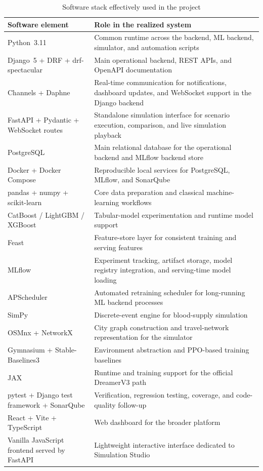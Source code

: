 \begin{table}[htbp]
\centering
\caption{Software stack effectively used in the project}
\label{tab:software-environment}
\small
\begin{tabular}{@{}lp{9.5cm}@{}}
\toprule
\textbf{Software element} & \textbf{Role in the realized system} \\
\midrule
Python~3.11 & Common runtime across the backend, ML backend, simulator, and automation scripts \\
Django~5 + DRF + drf-spectacular & Main operational backend, REST APIs, and OpenAPI documentation \\
Channels + Daphne & Real-time communication for notifications, dashboard updates, and WebSocket support in the Django backend \\
FastAPI + Pydantic + WebSocket routes & Standalone simulation interface for scenario execution, comparison, and live simulation playback \\
PostgreSQL & Main relational database for the operational backend and MLflow backend store \\
Docker + Docker Compose & Reproducible local services for PostgreSQL, MLflow, and SonarQube \\
pandas + numpy + scikit-learn & Core data preparation and classical machine-learning workflows \\
CatBoost / LightGBM / XGBoost & Tabular-model experimentation and runtime model support \\
Feast & Feature-store layer for consistent training and serving features \\
MLflow & Experiment tracking, artifact storage, model registry integration, and serving-time model loading \\
APScheduler & Automated retraining scheduler for long-running ML backend processes \\
SimPy & Discrete-event engine for blood-supply simulation \\
OSMnx + NetworkX & City graph construction and travel-network representation for the simulator \\
Gymnasium + Stable-Baselines3 & Environment abstraction and PPO-based training baselines \\
JAX & Runtime and training support for the official DreamerV3 path \\
pytest + Django test framework + SonarQube & Verification, regression testing, coverage, and code-quality follow-up \\
React + Vite + TypeScript & Web dashboard for the broader platform \\
Vanilla JavaScript frontend served by FastAPI & Lightweight interactive interface dedicated to Simulation Studio \\
\bottomrule
\end{tabular}
\end{table}


